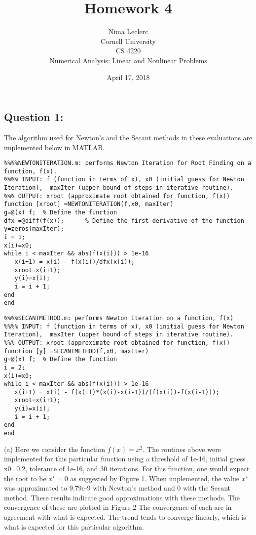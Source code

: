 \documentclass{article}
\begin{document}
 
\title{\bf{Homework 4}}

\author{Nima Leclerc\\Cornell University\\CS 4220 \\ Numerical Analysis: Linear and Nonlinear Problems}
\date{April 17, 2018}
\maketitle
\newpage   
\subsection*{Question 1:}
The algorithm used for Newton's and the Secant methods  in these evaluations are implemented below in MATLAB. 
\begin{lstlisting}
%%%%NEWTONITERATION.m: performs Newton Iteration for Root Finding on a function, f(x). 
%%%% INPUT: f (function in terms of x), x0 (initial guess for Newton Iteration),  maxIter (upper bound of steps in iterative routine). 
%%% OUTPUT: xroot (approximate root obtained for function, f(x)) 
function [xroot] =NEWTONITERATION(f,x0, maxIter) 
g=@(x) f;  % Define the function
dfx =@diff(f(x));      % Define the first derivative of the function
y=zeros(maxIter); 
i = 1;
x(i)=x0; 
while i < maxIter && abs(f(x(i))) > 1e-16  
   x(i+1) = x(i) - f(x(i))/dfx(x(i));
   xroot=x(i+1); 
   y(i)=x(i); 
   i = i + 1;
end 
end 
\end{lstlisting}
\begin{lstlisting}
%%%%SECANTMETHOD.m: performs Newton Iteration on a function, f(x) 
%%%% INPUT: f (function in terms of x), x0 (initial guess for Newton Iteration),  maxIter (upper bound of steps in iterative routine). 
%%% OUTPUT: xroot (approximate root obtained for function, f(x)) 
function [y] =SECANTMETHOD(f,x0, maxIter) 
g=@(x) f;  % Define the function
i = 2;
x(i)=x0; 
while i < maxIter && abs(f(x(i))) > 1e-16  
   x(i+1) = x(i) - f(x(i))*(x(i)-x(i-1))/(f(x(i))-f(x(i-1)));
   xroot=x(i+1); 
   y(i)=x(i); 
   i = i + 1;
end
end 
\end{lstlisting}
(a) Here we consider the function $f(x) =x^{2}$. 
The routines above were implemented for this particular function using a threshold of  1e-16, initial guess x0=0.2, tolerance of 1e-16,  and 30 iterations. For this function, one would expect the root to be $x^{\star} =0$ as suggested by Figure 1.  When implemented, the value  $x^{\star}$  was approximated to 9.79e-9  with Newton's method and 0 with the Secant method. These results indicate good approximations with these methods. The convergence of these  are plotted in Figure 2  The convergence of each are in agreement with what is expected. The trend tends to converge linearly, which is what is expected for this particular algorithm. 
\end{document}
